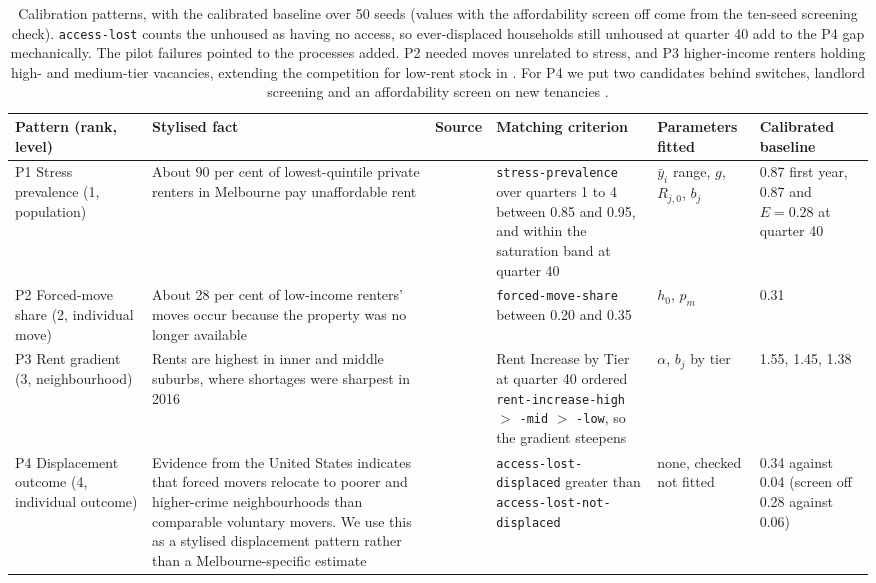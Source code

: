 \documentclass[10pt,a4paper]{article}
\begin{document}
\begin{table}[tp]
\centering
\caption{Calibration patterns, with the calibrated baseline over 50 seeds (values with the affordability screen off come from the ten-seed screening check). \texttt{access-lost} counts the unhoused as having no access, so ever-displaced households still unhoused at quarter 40 add to the P4 gap mechanically. The pilot failures pointed to the processes added. P2 needed moves unrelated to stress, and P3 higher-income renters holding high- and medium-tier vacancies, extending the competition for low-rent stock in \citep{2}. For P4 we put two candidates behind switches, landlord screening \citep{31} and an affordability screen on new tenancies \citep{13}.}
\label{tab:patterns}
\small
\begin{tabular}{L{2.0cm}L{3.1cm}L{1.0cm}L{3.0cm}L{1.95cm}L{2.0cm}}
\toprule
\textbf{Pattern (rank, level)} & \textbf{Stylised fact} & \textbf{Source} & \textbf{Matching criterion} & \textbf{Parameters fitted} & \textbf{Calibrated baseline} \\
\midrule
P1 Stress prevalence (1, population) & About 90 per cent of lowest-quintile private renters in Melbourne pay unaffordable rent & \citep{1} & \texttt{stress-prevalence} over quarters 1 to 4 between 0.85 and 0.95, and within the saturation band at quarter 40 & $\bar y_i$ range, $g$, $R_{j,0}$, $b_j$ & 0.87 first year, 0.87 and $E=0.28$ at quarter 40 \\
P2 Forced-move share (2, individual move) & About 28 per cent of low-income renters' moves occur because the property was no longer available & \citep{13} & \texttt{forced-move-share} between 0.20 and 0.35 & $h_0$, $p_m$ & 0.31 \\
P3 Rent gradient (3, neighbourhood) & Rents are highest in inner and middle suburbs, where shortages were sharpest in 2016 & \citep{1,8} & Rent Increase by Tier at quarter 40 ordered \texttt{rent-increase-high} $>$ \texttt{-mid} $>$ \texttt{-low}, so the gradient steepens & $\alpha$, $b_j$ by tier & 1.55, 1.45, 1.38 \\
P4 Displacement outcome (4, individual outcome) & Evidence from the United States indicates that forced movers relocate to poorer and higher-crime neighbourhoods than comparable voluntary movers. We use this as a stylised displacement pattern rather than a Melbourne-specific estimate & \citep{11} & \texttt{access-lost-}\allowbreak\texttt{displaced} greater than \texttt{access-lost-}\allowbreak\texttt{not-displaced} & none, checked not fitted & 0.34 against 0.04 (screen off 0.28 against 0.06) \\
\bottomrule
\end{tabular}
\end{table}
\end{document}
